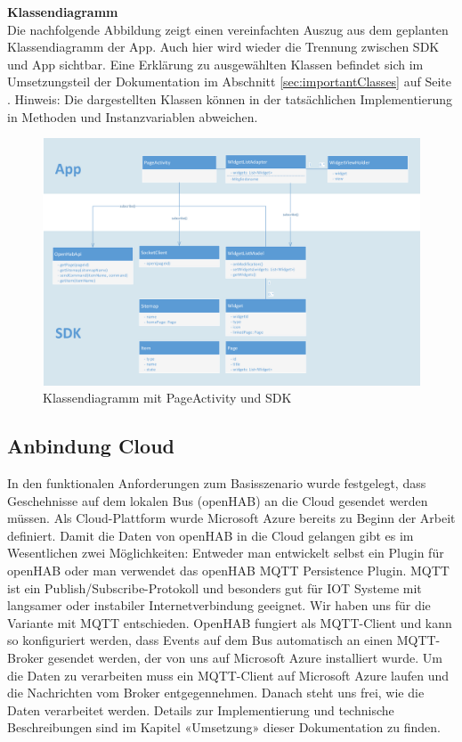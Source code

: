 \textbf{Klassendiagramm}\\
Die nachfolgende Abbildung zeigt einen vereinfachten Auszug aus dem geplanten Klassendiagramm der App. Auch hier wird wieder die Trennung zwischen SDK und App sichtbar. Eine Erklärung zu ausgewählten Klassen befindet sich im Umsetzungsteil der Dokumentation im Abschnitt \ref{sec:importantClasses} auf Seite \pageref{sec:importantClasses}. Hinweis: Die dargestellten Klassen können in der tatsächlichen Implementierung in Methoden und Instanzvariablen abweichen.
\begin{figure}[H]
	\centering
		\includegraphics[width=\textwidth]{report/img/android_uml.png}
	\caption{Klassendiagramm mit PageActivity und SDK}
	\label{fig:androidUML}
\end{figure}


\subsection{Anbindung Cloud}

In den funktionalen Anforderungen zum Basisszenario wurde festgelegt, dass Geschehnisse auf dem lokalen Bus (openHAB) an die Cloud gesendet werden müssen. Als Cloud-Plattform wurde Microsoft Azure bereits zu Beginn der Arbeit definiert. Damit die Daten von openHAB in die Cloud gelangen gibt es im Wesentlichen zwei Möglichkeiten: Entweder man entwickelt selbst ein Plugin für openHAB oder man verwendet das openHAB MQTT Persistence Plugin. MQTT ist ein Publish/Subscribe-Protokoll und besonders gut für IOT Systeme mit langsamer oder instabiler Internetverbindung geeignet. Wir haben uns für die Variante mit MQTT entschieden. OpenHAB fungiert als MQTT-Client und kann so konfiguriert werden, dass Events auf dem Bus automatisch an einen MQTT-Broker gesendet werden, der von uns auf Microsoft Azure installiert wurde. Um die Daten zu verarbeiten muss ein MQTT-Client auf Microsoft Azure laufen und die Nachrichten vom Broker entgegennehmen. Danach steht uns frei, wie die Daten verarbeitet werden. Details zur Implementierung und technische Beschreibungen sind im Kapitel «Umsetzung» dieser Dokumentation zu finden. 

